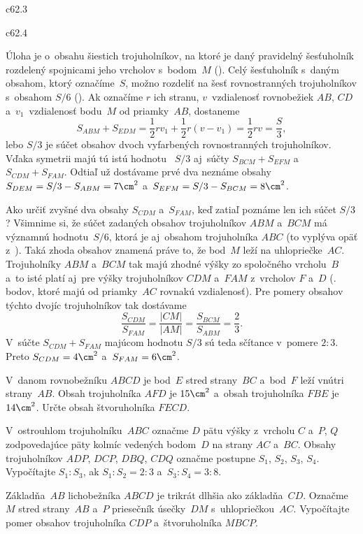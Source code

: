 {%
\mppic c62.3 \hfil\Obr \par
\mppic c62.4 \hfil\Obr \par
Úloha je o~obsahu šiestich trojuholníkov, na ktoré je daný pravidelný
šesťuholník rozdelený spojnicami jeho vrcholov s~bodom~$M$ (\obr).
Celý šesťuholník s~daným obsahom, ktorý označíme~$S$,
možno rozdeliť na šesť rovnostranných trojuholníkov s~obsahom $S/6$
(\obr). Ak označíme $r$ ich stranu,
$v$~vzdialenosť rovnobežiek $AB$, $CD$
a~$v_1$~vzdialenosť bodu~$M$ od priamky~$AB$, dostaneme
$$
S_{ABM}+S_{EDM}=\frac12rv_1+\frac12r(v-v_1)=\frac12rv=\frac S3,
$$
lebo $S/3$ je súčet obsahov dvoch vyfarbených rovnostranných
trojuholníkov. Vďaka symetrii majú tú istú hodnotu~
$S/3$ aj~súčty $S_{BCM}+S_{EFM}$ a~$S_{CDM}+S_{FAM}$.
Odtiaľ už dostávame prvé dva neznáme obsahy
$S_{DEM}=S/3-S_{ABM}=7\cm^2$ a~$S_{EFM}=S/3-S_{BCM}=8\cm^2$.
\twocpictures

Ako určiť zvyšné dva obsahy $S_{CDM}$ a~$S_{FAM}$, keď
zatiaľ poznáme len ich súčet $S/3$?
Všimnime si, že súčet zadaných obsahov
trojuholníkov $ABM$ a~$BCM$ má významnú hodnotu~$S/6$, ktorá je
aj~obsahom trojuholníka $ABC$ (to vyplýva opäť z~).
Taká zhoda obsahov znamená práve to, že bod~$M$ leží na uhlopriečke~$AC$.
Trojuholníky $ABM$ a~$BCM$ tak majú zhodné výšky
zo spoločného vrcholu~$B$ a~to isté platí aj~pre výšky trojuholníkov $CDM$ a~$FAM$
z~vrcholov $F$ a~$D$ (\tj. bodov, ktoré majú od priamky~$AC$ rovnakú
vzdialenosť). Pre pomery obsahov týchto dvojíc trojuholníkov tak dostávame
$$
\frac{S_{CDM}}{S_{FAM}}=\frac{|CM|}{|AM|}
=\frac{S_{BCM}}{S_{ABM}}=\frac23.
$$
V~súčte $S_{CDM}+S_{FAM}$ majúcom hodnotu $S/3$ sú teda
sčítance v~pomere $2:3$. Preto $S_{CDM}=4\cm^2$
a~$S_{FAM}=6\cm^2$.


V~danom rovnobežníku $ABCD$ je bod~$E$ stred
strany~$BC$ a~bod~$F$ leží vnútri strany~$AB$.
Obsah trojuholníka $AFD$ je $15\cm^2$
a~obsah trojuholníka $FBE$ je $14\cm^2$.
Určte obsah štvoruholníka $FECD$.
\vpravo{[57--C--S--2]}

V~ostrouhlom trojuholníku~$ABC$ označme $D$ pätu výšky z~vrcholu $C$ a~$P$, $Q$
zodpovedajúce päty kolmíc vedených bodom~$D$ na strany $AC$ a~$BC$. Obsahy
trojuholníkov $ADP$, $DCP$, $DBQ$, $CDQ$ označme postupne $S_1$, $S_2$, $S_3$, $S_4$.
Vypočítajte $S_1:S_3$, ak $S_1:S_2=2:3$ a~$S_3:S_4=3:8$.
\vpravo{[55--C--I--5]}

\D
Základňa~$AB$ lichobežníka $ABCD$ je trikrát dlhšia ako
základňa~$CD$. Označme $M$ stred strany~$AB$ a~$P$ priesečník
úsečky~$DM$ s~uhlopriečkou~$AC$. Vypočítajte pomer obsahov
trojuholníka $CDP$ a~štvoruholníka $MBCP$.
\vpravo{[55--C--II--1]}
}

